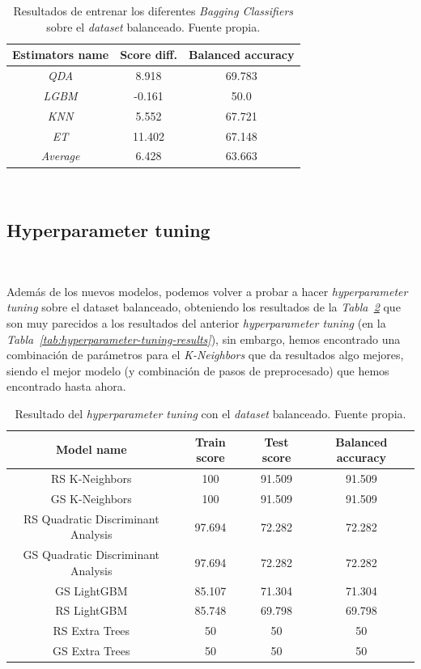\begin{table}[!h]
    \centering
    \begin{tabular}{|c|cc|}
        \hline
        Estimators name & Score diff. & Balanced accuracy \\ \hline
        \textit{QDA} & 8.918 & 69.783 \\ 
        \textit{LGBM} & -0.161 & 50.0 \\ 
        \textit{KNN} & 5.552 & 67.721 \\ 
        \textit{ET} & 11.402 & 67.148 \\ \hline
        \textit{Average} & 6.428 & 63.663 \\ \hline
    \end{tabular}
    \caption{Resultados de entrenar los diferentes \textit{Bagging Classifiers} sobre el \textit{dataset} balanceado. Fuente propia.}\ \label{tab:bagging-results}
\end{table}

\clearpage
\subsection{Hyperparameter tuning}\ \label{sec:hyperparameter-tuning-2}

Además de los nuevos modelos, podemos volver a probar a hacer \textit{hyperparameter tuning} sobre el dataset balanceado, obteniendo los resultados de la \textit{Tabla\ \ref{tab:hyperparameter-tuning-results-v2}} que son muy parecidos a los resultados del anterior \textit{hyperparameter tuning} (en la \textit{Tabla\ \ref{tab:hyperparameter-tuning-results}}), sin embargo, hemos encontrado una combinación de parámetros para el \textit{K-Neighbors} que da resultados algo mejores, siendo el mejor modelo (y combinación de pasos de preprocesado) que hemos encontrado hasta ahora.

\begin{table}[!h]
    \centering
    \begin{tabular}{|c|ccc|} \hline
        Model name & Train score & Test score & Balanced accuracy \\ \hline
        RS K-Neighbors & 100 & 91.509 & 91.509 \\ 
        GS K-Neighbors & 100 & 91.509 & 91.509 \\ 
        RS Quadratic Discriminant Analysis & 97.694 & 72.282 & 72.282 \\ 
        GS Quadratic Discriminant Analysis & 97.694 & 72.282 & 72.282 \\ 
        GS LightGBM & 85.107 & 71.304 & 71.304 \\ 
        RS LightGBM & 85.748 & 69.798 & 69.798 \\ 
        RS Extra Trees & 50 & 50 & 50 \\ 
        GS Extra Trees & 50 & 50 & 50 \\ \hline
    \end{tabular}
    \caption{Resultado del \textit{hyperparameter tuning} con el \textit{dataset} balanceado. Fuente propia.}\ \label{tab:hyperparameter-tuning-results-v2}
\end{table}